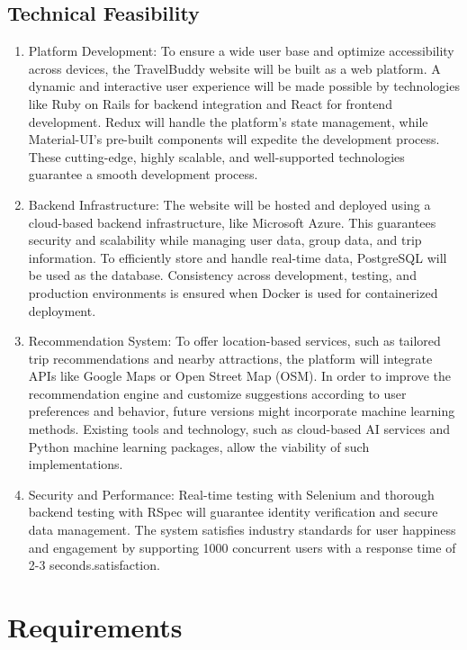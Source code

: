 \documentclass[12pt,a4paper]{report}
\begin{document}
\section{Technical Feasibility}
\begin{enumerate}
    \item Platform Development: To ensure a wide user base and optimize accessibility across devices, the TravelBuddy website will be built as a web platform. A dynamic and interactive user experience will be made possible by technologies like Ruby on Rails for backend integration and React for frontend development. Redux will handle the platform's state management, while Material-UI's pre-built components will expedite the development process. These cutting-edge, highly scalable, and well-supported technologies guarantee a smooth development process.
    \item Backend Infrastructure: The website will be hosted and deployed using a cloud-based backend infrastructure, like Microsoft Azure. This guarantees security and scalability while managing user data, group data, and trip information. To efficiently store and handle real-time data, PostgreSQL will be used as the database. Consistency across development, testing, and production environments is ensured when Docker is used for containerized deployment.
    \item Recommendation System: To offer location-based services, such as tailored trip recommendations and nearby attractions, the platform will integrate APIs like Google Maps or Open Street Map (OSM). In order to improve the recommendation engine and customize suggestions according to user preferences and behavior, future versions might incorporate machine learning methods. Existing tools and technology, such as cloud-based AI services and Python machine learning packages, allow the viability of such implementations.
    \item Security and Performance: Real-time testing with Selenium and thorough backend testing with RSpec will guarantee identity verification and secure data management. The system satisfies industry standards for user happiness and engagement by supporting 1000 concurrent users with a response time of 2-3 seconds.satisfaction.
\end{enumerate}
\chapter{Requirements}
\end{document}
